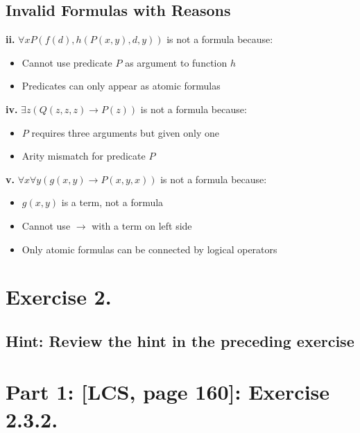 \documentclass{article}
\begin{document}
\subsection*{Invalid Formulas with Reasons}

\textbf{ii.} $\forall x P(f(d), h(P(x, y), d, y))$ is not a formula because:
\begin{itemize}
    \item Cannot use predicate $P$ as argument to function $h$
    \item Predicates can only appear as atomic formulas
\end{itemize}

\textbf{iv.} $\exists z (Q(z, z, z) \rightarrow P(z))$ is not a formula because:
\begin{itemize}
    \item $P$ requires three arguments but given only one
    \item Arity mismatch for predicate $P$
\end{itemize}

\textbf{v.} $\forall x \forall y (g(x, y) \rightarrow P(x, y, x))$ is not a formula because:
\begin{itemize}
    \item $g(x, y)$ is a term, not a formula
    \item Cannot use $\rightarrow$ with a term on left side
    \item Only atomic formulas can be connected by logical operators
\end{itemize}

\newpage
\section*{Exercise 2.}

\subsection*{Hint: Review the hint in the preceding exercise}



\begin{mdframed}
\end{mdframed}

\section*{Part 1: [LCS, page 160]: Exercise 2.3.2. }


\vspace{1em}
\end{document}
